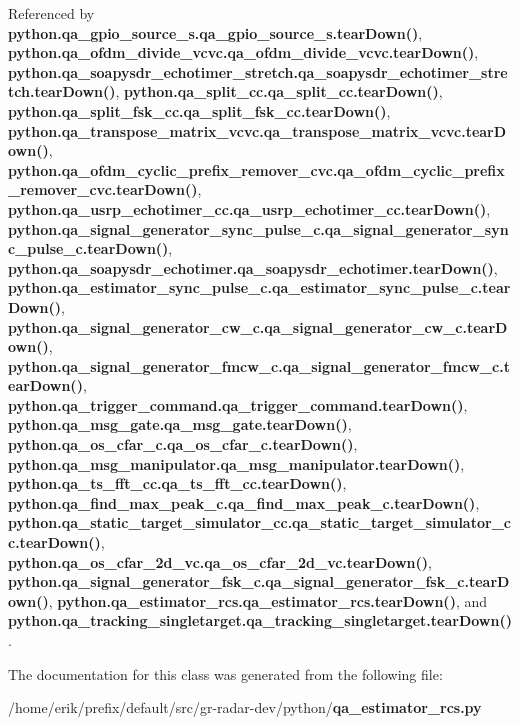 Referenced by {\bf python.\+qa\+\_\+gpio\+\_\+source\+\_\+s.\+qa\+\_\+gpio\+\_\+source\+\_\+s.\+tear\+Down()}, {\bf python.\+qa\+\_\+ofdm\+\_\+divide\+\_\+vcvc.\+qa\+\_\+ofdm\+\_\+divide\+\_\+vcvc.\+tear\+Down()}, {\bf python.\+qa\+\_\+soapysdr\+\_\+echotimer\+\_\+stretch.\+qa\+\_\+soapysdr\+\_\+echotimer\+\_\+stretch.\+tear\+Down()}, {\bf python.\+qa\+\_\+split\+\_\+cc.\+qa\+\_\+split\+\_\+cc.\+tear\+Down()}, {\bf python.\+qa\+\_\+split\+\_\+fsk\+\_\+cc.\+qa\+\_\+split\+\_\+fsk\+\_\+cc.\+tear\+Down()}, {\bf python.\+qa\+\_\+transpose\+\_\+matrix\+\_\+vcvc.\+qa\+\_\+transpose\+\_\+matrix\+\_\+vcvc.\+tear\+Down()}, {\bf python.\+qa\+\_\+ofdm\+\_\+cyclic\+\_\+prefix\+\_\+remover\+\_\+cvc.\+qa\+\_\+ofdm\+\_\+cyclic\+\_\+prefix\+\_\+remover\+\_\+cvc.\+tear\+Down()}, {\bf python.\+qa\+\_\+usrp\+\_\+echotimer\+\_\+cc.\+qa\+\_\+usrp\+\_\+echotimer\+\_\+cc.\+tear\+Down()}, {\bf python.\+qa\+\_\+signal\+\_\+generator\+\_\+sync\+\_\+pulse\+\_\+c.\+qa\+\_\+signal\+\_\+generator\+\_\+sync\+\_\+pulse\+\_\+c.\+tear\+Down()}, {\bf python.\+qa\+\_\+soapysdr\+\_\+echotimer.\+qa\+\_\+soapysdr\+\_\+echotimer.\+tear\+Down()}, {\bf python.\+qa\+\_\+estimator\+\_\+sync\+\_\+pulse\+\_\+c.\+qa\+\_\+estimator\+\_\+sync\+\_\+pulse\+\_\+c.\+tear\+Down()}, {\bf python.\+qa\+\_\+signal\+\_\+generator\+\_\+cw\+\_\+c.\+qa\+\_\+signal\+\_\+generator\+\_\+cw\+\_\+c.\+tear\+Down()}, {\bf python.\+qa\+\_\+signal\+\_\+generator\+\_\+fmcw\+\_\+c.\+qa\+\_\+signal\+\_\+generator\+\_\+fmcw\+\_\+c.\+tear\+Down()}, {\bf python.\+qa\+\_\+trigger\+\_\+command.\+qa\+\_\+trigger\+\_\+command.\+tear\+Down()}, {\bf python.\+qa\+\_\+msg\+\_\+gate.\+qa\+\_\+msg\+\_\+gate.\+tear\+Down()}, {\bf python.\+qa\+\_\+os\+\_\+cfar\+\_\+c.\+qa\+\_\+os\+\_\+cfar\+\_\+c.\+tear\+Down()}, {\bf python.\+qa\+\_\+msg\+\_\+manipulator.\+qa\+\_\+msg\+\_\+manipulator.\+tear\+Down()}, {\bf python.\+qa\+\_\+ts\+\_\+fft\+\_\+cc.\+qa\+\_\+ts\+\_\+fft\+\_\+cc.\+tear\+Down()}, {\bf python.\+qa\+\_\+find\+\_\+max\+\_\+peak\+\_\+c.\+qa\+\_\+find\+\_\+max\+\_\+peak\+\_\+c.\+tear\+Down()}, {\bf python.\+qa\+\_\+static\+\_\+target\+\_\+simulator\+\_\+cc.\+qa\+\_\+static\+\_\+target\+\_\+simulator\+\_\+cc.\+tear\+Down()}, {\bf python.\+qa\+\_\+os\+\_\+cfar\+\_\+2d\+\_\+vc.\+qa\+\_\+os\+\_\+cfar\+\_\+2d\+\_\+vc.\+tear\+Down()}, {\bf python.\+qa\+\_\+signal\+\_\+generator\+\_\+fsk\+\_\+c.\+qa\+\_\+signal\+\_\+generator\+\_\+fsk\+\_\+c.\+tear\+Down()}, {\bf python.\+qa\+\_\+estimator\+\_\+rcs.\+qa\+\_\+estimator\+\_\+rcs.\+tear\+Down()}, and {\bf python.\+qa\+\_\+tracking\+\_\+singletarget.\+qa\+\_\+tracking\+\_\+singletarget.\+tear\+Down()}.



The documentation for this class was generated from the following file\+:\begin{DoxyCompactItemize}
\item 
/home/erik/prefix/default/src/gr-\/radar-\/dev/python/{\bf qa\+\_\+estimator\+\_\+rcs.\+py}\end{DoxyCompactItemize}
